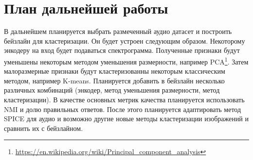 \documentclass[a4paper,12pt]{extarticle}
\begin{document}
\section{План дальнейшей работы}

В дальнейшем планируется выбрать размеченный аудио 
датасет и построить бейзлайн для кластеризации. Он будет 
устроен следующим образом. Некоторому энкодеру на вход 
будет подаваться спектрограмма. Полученные признаки будут 
уменьшены некоторым методом уменьшения размерности, например
PCA\footnote{\url{https://en.wikipedia.org/wiki/Principal\_component\_analysis}}. Затем малоразмерные признаки будут 
кластеризованны некоторым классическим методом, например 
K-means. Планируется добавить в бейзлайн несколько различных
комбинаций (энкодер, метод уменьшения размерности, метод 
кластеризации). В качестве основных метрик качества планируется
использовать NMI и долю правильных ответов. После этого 
планируется адаптировать метод SPICE для аудио и возможно 
другие новые методы кластеризации изображений и сравнить их 
с бейзлайном. 
	
\newpage 
\printbibliography[heading=bibintoc] 
	
\end{document}
